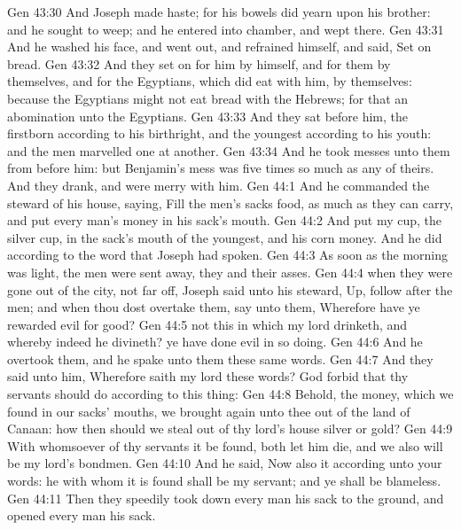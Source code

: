 \vs Gen 43:30 And Joseph made haste; for his bowels did yearn upon his brother: and he sought  to weep; and he entered into  chamber, and wept there.
\vs Gen 43:31 And he washed his face, and went out, and refrained himself, and said, Set on bread.
\vs Gen 43:32 And they set on for him by himself, and for them by themselves, and for the Egyptians, which did eat with him, by themselves: because the Egyptians might not eat bread with the Hebrews; for that  an abomination unto the Egyptians.
\vs Gen 43:33 And they sat before him, the firstborn according to his birthright, and the youngest according to his youth: and the men marvelled one at another.
\vs Gen 43:34 And he took  messes unto them from before him: but Benjamin's mess was five times so much as any of theirs. And they drank, and were merry with him.
\vs Gen 44:1 And he commanded the steward of his house, saying, Fill the men's sacks  food, as much as they can carry, and put every man's money in his sack's mouth.
\vs Gen 44:2 And put my cup, the silver cup, in the sack's mouth of the youngest, and his corn money. And he did according to the word that Joseph had spoken.
\vs Gen 44:3 As soon as the morning was light, the men were sent away, they and their asses.
\vs Gen 44:4  when they were gone out of the city,  not  far off, Joseph said unto his steward, Up, follow after the men; and when thou dost overtake them, say unto them, Wherefore have ye rewarded evil for good?
\vs Gen 44:5  not this  in which my lord drinketh, and whereby indeed he divineth? ye have done evil in so doing.
\vs Gen 44:6 And he overtook them, and he spake unto them these same words.
\vs Gen 44:7 And they said unto him, Wherefore saith my lord these words? God forbid that thy servants should do according to this thing:
\vs Gen 44:8 Behold, the money, which we found in our sacks' mouths, we brought again unto thee out of the land of Canaan: how then should we steal out of thy lord's house silver or gold?
\vs Gen 44:9 With whomsoever of thy servants it be found, both let him die, and we also will be my lord's bondmen.
\vs Gen 44:10 And he said, Now also  it  according unto your words: he with whom it is found shall be my servant; and ye shall be blameless.
\vs Gen 44:11 Then they speedily took down every man his sack to the ground, and opened every man his sack.
